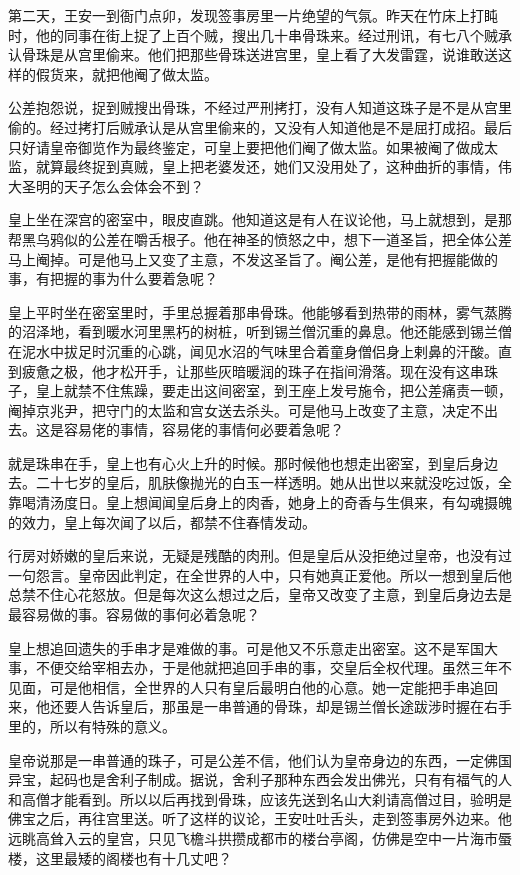 第二天，王安一到衙门点卯，发现签事房里一片绝望的气氛。昨天在竹床上打盹时，他的同事在街上捉了上百个贼，搜出几十串骨珠来。经过刑讯，有七八个贼承认骨珠是从宫里偷来。他们把那些骨珠送进宫里，皇上看了大发雷霆，说谁敢送这样的假货来，就把他阉了做太监。 

公差抱怨说，捉到贼搜出骨珠，不经过严刑拷打，没有人知道这珠子是不是从宫里偷的。经过拷打后贼承认是从宫里偷来的，又没有人知道他是不是屈打成招。最后只好请皇帝御览作为最终鉴定，可皇上要把他们阉了做太监。如果被阉了做成太监，就算最终捉到真贼，皇上把老婆发还，她们又没用处了，这种曲折的事情，伟大圣明的天子怎么会体会不到？ 

皇上坐在深宫的密室中，眼皮直跳。他知道这是有人在议论他，马上就想到，是那帮黑乌鸦似的公差在嚼舌根子。他在神圣的愤怒之中，想下一道圣旨，把全体公差马上阉掉。可是他马上又变了主意，不发这圣旨了。阉公差，是他有把握能做的事，有把握的事为什么要着急呢？ 

皇上平时坐在密室里时，手里总握着那串骨珠。他能够看到热带的雨林，雾气蒸腾的沼泽地，看到暖水河里黑朽的树桩，听到锡兰僧沉重的鼻息。他还能感到锡兰僧在泥水中拔足时沉重的心跳，闻见水沼的气味里合着童身僧侣身上剌鼻的汗酸。直到疲惫之极，他才松开手，让那些灰暗暖润的珠子在指间滑落。现在没有这串珠子，皇上就禁不住焦躁，要走出这间密室，到王座上发号施令，把公差痛责一顿，阉掉京兆尹，把守门的太监和宫女送去杀头。可是他马上改变了主意，决定不出去。这是容易佬的事情，容易佬的事情何必要着急呢？ 

就是珠串在手，皇上也有心火上升的时候。那时候他也想走出密室，到皇后身边去。二十七岁的皇后，肌肤像抛光的白玉一样透明。她从出世以来就没吃过饭，全靠喝清汤度日。皇上想闻闻皇后身上的肉香，她身上的奇香与生俱来，有勾魂摄魄的效力，皇上每次闻了以后，都禁不住春情发动。 

行房对娇嫩的皇后来说，无疑是残酷的肉刑。但是皇后从没拒绝过皇帝，也没有过一句怨言。皇帝因此判定，在全世界的人中，只有她真正爱他。所以一想到皇后他总禁不住心花怒放。但是每次这么想过之后，皇帝又改变了主意，到皇后身边去是最容易做的事。容易做的事何必着急呢？ 

皇上想追回遗失的手串才是难做的事。可是他又不乐意走出密室。这不是军国大事，不便交给宰相去办，于是他就把追回手串的事，交皇后全权代理。虽然三年不见面，可是他相信，全世界的人只有皇后最明白他的心意。她一定能把手串追回来，他还要人告诉皇后，那虽是一串普通的骨珠，却是锡兰僧长途跋涉时握在右手里的，所以有特殊的意义。 

皇帝说那是一串普通的珠子，可是公差不信，他们认为皇帝身边的东西，一定佛国异宝，起码也是舍利子制成。据说，舍利子那种东西会发出佛光，只有有福气的人和高僧才能看到。所以以后再找到骨珠，应该先送到名山大刹请高僧过目，验明是佛宝之后，再往宫里送。听了这样的议论，王安吐吐舌头，走到签事房外边来。他远眺高耸入云的皇宫，只见飞檐斗拱攒成都市的楼台亭阁，仿佛是空中一片海市蜃楼，这里最矮的阁楼也有十几丈吧？ 

